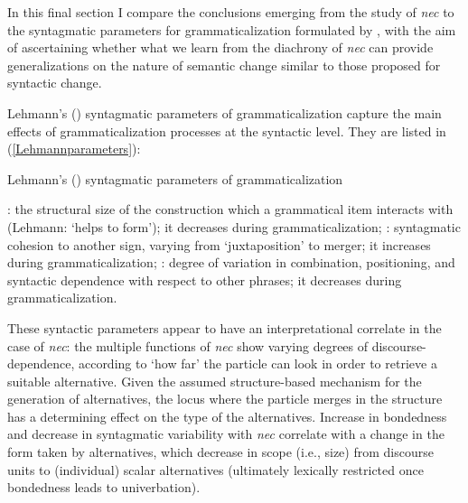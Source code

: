 \documentclass[output=paper]{langsci/langscibook}
\begin{document}
In this final section I compare the conclusions emerging from the study of {\emph{nec}} to the syntagmatic parameters for grammaticalization formulated by \citet{Lehmann15}, with the aim of ascertaining whether what we learn from the diachrony of {\emph{nec}} can provide generalizations on the nature of semantic change similar to those proposed for syntactic change.

Lehmann's (\citeyear[129--134; 152--170]{Lehmann15}) syntagmatic parameters of grammaticalization capture the main effects of grammaticalization processes at the syntactic level. They are listed in (\ref{Lehmannparameters}):

{\begin{exe}
\ex \label{Lehmannparameters} Lehmann's (\citeyear[152--170]{Lehmann15}) syntagmatic parameters of grammaticalization
\begin{xlist}
: the structural size of the construction which a grammatical item interacts with (Lehmann: `helps to form'); it decreases during grammaticalization; %
: syntagmatic cohesion to another sign, varying from `juxtaposition' to merger; it increases during grammaticalization; %
: degree of variation in combination, positioning, and syntactic dependence with respect to other phrases; it decreases during grammaticalization. %
\end{xlist}
\end{exe}}

\noindent These syntactic parameters appear to have an interpretational correlate in the case of {\emph{nec}}: the multiple functions of {\emph{nec}} show varying degrees of discourse-dependence, according to `how far' the particle can look in order to retrieve a suitable alternative. Given the assumed structure-based mechanism for the generation of alternatives, the locus where the particle merges in the structure has a determining effect on the type of the alternatives. Increase in bondedness and decrease in syntagmatic variability with {\emph{nec}} correlate with a change in the form taken by alternatives, which decrease in scope (i.e., size) from discourse units to (individual) scalar alternatives (ultimately lexically restricted once bondedness leads to univerbation).
\end{document}
